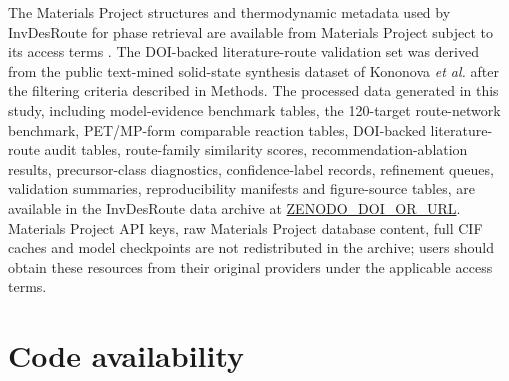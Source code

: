 \documentclass[11pt, letterpaper]{article}
\newcommand{\invdesroute}{InvDesRoute}
\begin{document}
The Materials Project structures and thermodynamic metadata used by \invdesroute{} for phase retrieval are available from Materials Project subject to its access terms \cite{jain2013materialsproject}. The DOI-backed literature-route validation set was derived from the public text-mined solid-state synthesis dataset of Kononova \textit{et al.} \cite{kononova2019textmined,cedergrouphub_textmined_synthesis_public} after the filtering criteria described in Methods. The processed data generated in this study, including model-evidence benchmark tables, the 120-target route-network benchmark, PET/MP-form comparable reaction tables, DOI-backed literature-route audit tables, route-family similarity scores, recommendation-ablation results, precursor-class diagnostics, confidence-label records, refinement queues, validation summaries, reproducibility manifests and figure-source tables, are available in the InvDesRoute data archive at \url{ZENODO_DOI_OR_URL}. Materials Project API keys, raw Materials Project database content, full CIF caches and model checkpoints are not redistributed in the archive; users should obtain these resources from their original providers under the applicable access terms.

\section*{Code availability}
\end{document}

